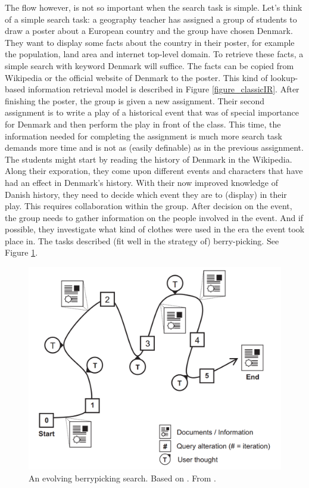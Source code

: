 The flow however, is not so important when the search task is simple. Let's think of a simple search task: a geography teacher has assigned a group of students to draw a poster about a European country and the group have chosen Denmark. They want to display some facts about the country in their poster, for example the population, land area and internet top-level domain. To retrieve these facts, a simple search with keyword Denmark will suffice.
The facts can be copied from Wikipedia or the official website of Denmark to the poster. This kind of lookup-based information retrieval model is described in Figure \ref{figure_classicIR}.
After finishing the poster, the group is given a new assignment.
Their second assignment is to write a play of a historical event that was of special importance for Denmark and then perform the play in front of the class.
This time, the information needed for completing the assignment is much more search task demands more time and is not as (easily definable) as in the previous assignment.
The students might start by reading the history of Denmark in the Wikipedia.
Along their exporation, they come upon different events and characters that have had an effect in Denmark's history.
With their now improved knowledge of Danish history, they need to decide which event they are to (display) in their play.
This requires collaboration within the group.
After decision on the event, the group needs to gather information on the people involved in the event. 
And if possible, they investigate what kind of clothes were used in the era the event took place in.
The tasks described (fit well in the strategy of) berry-picking. See Figure \ref{figure_bp}.

\begin{figure}[htp] %
\caption{An evolving berrypicking search. Based on \protect\cite{bates89}. From \protect\cite{march06}.}
\label{figure_bp}
\centering
\includegraphics[scale=0.25]{figures/berrypicking.pdf}
\end{figure}

